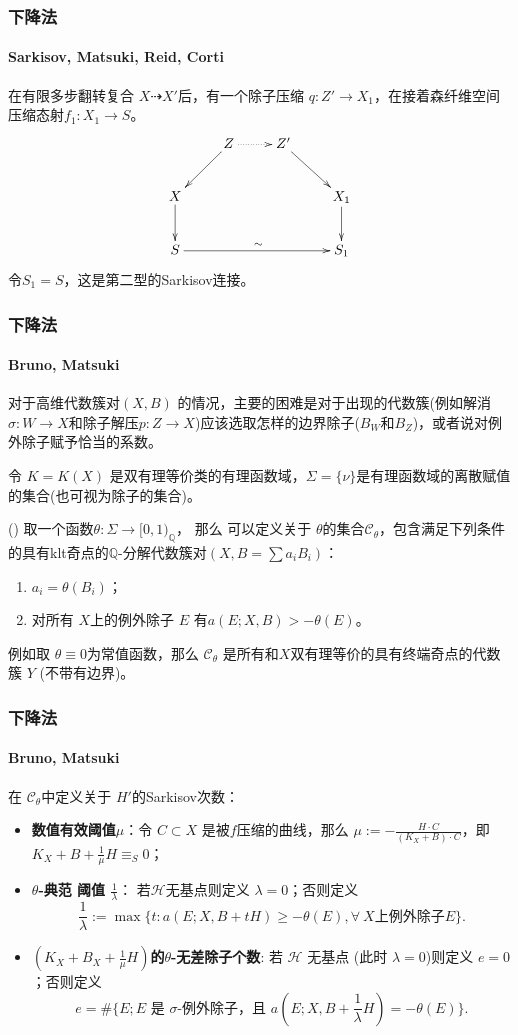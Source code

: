 \documentclass[10pt]{ctexbeamer}
\begin{document}
\begin{frame}[shrink]
  \frametitle{下降法}
  \framesubtitle{Sarkisov, Matsuki, Reid, Corti}

  在有限多步翻转复合 $ X\dashrightarrow X' $后，有一个除子压缩 $ q:Z'\to X_1 $，在接着森纤维空间压缩态射$f_1:X_1\to S$。
      \[ \xymatrix{
        &Z\ar@{.>}[r]\ar[ld] &Z'\ar[rd] \\
          X\ar[d]& & &X_{1}\ar[d]\\
          S\ar[rrr]^{\sim}   & & & S_{1} } \]
        令$ S_1=S $，这是第二型的Sarkisov连接。
\end{frame}

\begin{frame}[shrink]
  \frametitle{下降法}
  \framesubtitle{Bruno, Matsuki}
  对于高维代数簇对$(X,B)$ 的情况，主要的困难是对于出现的代数簇(例如解消$\sigma:W \to X $和除子解压$p:Z\to X$)应该选取怎样的边界除子($B_{W}$和$B_{Z}$)，或者说对例外除子赋予恰当的系数。

    \pause
令 $ K=K(X) $ 是双有理等价类的有理函数域，$ \Sigma=\{\nu\} $是有理函数域的离散赋值的集合(也可视为除子的集合)。
\begin{definition}(\citeauthor[Definition 3.5]{brunoLogSarkisovProgram1995})\label{thetacategory}
  取一个函数$\theta:\Sigma\to [0,1)_{\mathbb{Q}}$， 那么 可以定义关于  $\theta$的集合$ \mathcal{C}_{\theta} $，包含满足下列条件的具有klt奇点的$\mathbb{Q}$-分解代数簇对$ (X,B=\sum a_{i}B_{i}) $：
  \begin{enumerate}
    \item $ a_i=\theta(B_i) $；
    \item 对所有 $ X $上的例外除子 $E $ 有$ a(E;X,B)>-\theta(E) $。
  \end{enumerate}
\end{definition}
\pause
例如取 $\theta \equiv 0$为常值函数，那么 $\mathcal{C}_{\theta}$ 是所有和$X$双有理等价的具有终端奇点的代数簇 $Y$ (不带有边界)。
\end{frame}

\begin{frame}[shrink]
  \frametitle{下降法}
  \framesubtitle{Bruno, Matsuki}
  
在 $\mathcal{C}_{\theta}$中定义关于 $H'$的Sarkisov次数：
  \begin{itemize}
    \item \textbf{ 数值有效阈值$ \mu $}：令 $ C\subset X  $ 是被$ f $压缩的曲线，那么 $\mu:=-\frac{H\cdot C}{(K_X+B)\cdot C}$，即 $ K_X+B+\frac{1}{\mu} H \equiv_S0$；
    \item \textbf{$ \theta $-典范 阈值  $ \frac{1}{\lambda} $}：  若$ \mathcal{H} $无基点则定义 $\lambda=0$；否则定义
          \[ \frac{1}{\lambda}:=\max\{t:a(E;X,B+tH)\geqslant -\theta(E),  \forall \ X\text{上例外除子}E \}.\]
    \item \textbf{ $(K_{X}+B_{X}+\frac{1}{\mu}H)$的$\theta$-无差除子个数}: 若 $ \mathcal{H} $ 无基点 (此时 $ \lambda=0 $)则定义  $e=0$；否则定义
          \[ e=\#\{E; E \text{ 是 }\sigma\text{-例外除子，且 } a(E;X,B+\frac{1}{\lambda} H)=-\theta(E) \}. \]
  \end{itemize}
\end{frame}
\end{document}
